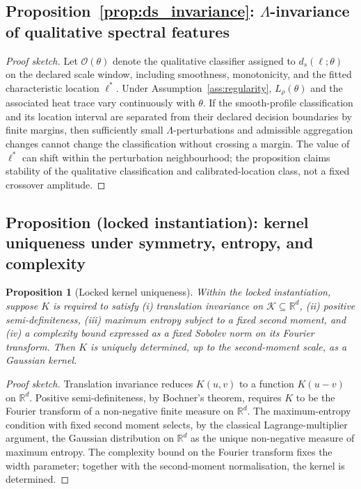 ﻿\documentclass[12pt,a4paper]{article}
\newtheorem{proposition}[theorem]{Proposition}
\theoremstyle{definition}
\begin{document}
\subsection[Lambda-invariance of qualitative spectral features]{Proposition~\ref{prop:ds_invariance}: $\Lambda$-invariance of qualitative spectral features}

\begin{proof}[Proof sketch]
Let $\mathcal{O}(\theta)$ denote the qualitative classifier assigned to $d_s(\ell;\theta)$ on the declared scale window, including smoothness, monotonicity, and the fitted characteristic location $\ell^\ast$. Under Assumption~\ref{ass:regularity}, $L_\rho(\theta)$ and the associated heat trace vary continuously with $\theta$. If the smooth-profile classification and its location interval are separated from their declared decision boundaries by finite margins, then sufficiently small $\Lambda$-perturbations and admissible aggregation changes cannot change the classification without crossing a margin. The value of $\ell^\ast$ can shift within the perturbation neighbourhood; the proposition claims stability of the qualitative classification and calibrated-location class, not a fixed crossover amplitude.
\end{proof}

\subsection{Proposition (locked instantiation): kernel uniqueness under symmetry, entropy, and complexity}

\begin{proposition}[Locked kernel uniqueness]
\label{prop:kernel_uniqueness}
Within the locked instantiation, suppose $K$ is required to satisfy (i) translation invariance on $\mathcal{K} \subseteq \mathbb{R}^d$, (ii) positive semi-definiteness, (iii) maximum entropy subject to a fixed second moment, and (iv) a complexity bound expressed as a fixed Sobolev norm on its Fourier transform. Then $K$ is uniquely determined, up to the second-moment scale, as a Gaussian kernel.
\end{proposition}

\begin{proof}[Proof sketch]
Translation invariance reduces $K(u,v)$ to a function $K(u-v)$ on $\mathbb{R}^d$. Positive semi-definiteness, by Bochner's theorem, requires $K$ to be the Fourier transform of a non-negative finite measure on $\mathbb{R}^d$. The maximum-entropy condition with fixed second moment selects, by the classical Lagrange-multiplier argument, the Gaussian distribution on $\mathbb{R}^d$ as the unique non-negative measure of maximum entropy. The complexity bound on the Fourier transform fixes the width parameter; together with the second-moment normalisation, the kernel is determined.
\end{proof}
\end{document}
